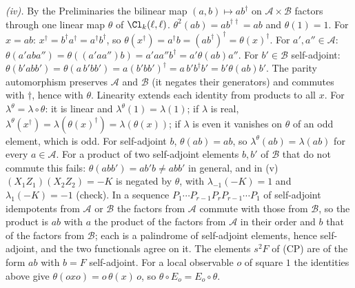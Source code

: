\emph{(iv).} By the Preliminaries the bilinear map $(a, b) \mapsto ab^{\dagger}$ on $\mathcal{A} \times \mathcal{B}$ factors through one linear map $\theta$ of $\Cl_{k}(\ell,\ell)$. $\theta^{2}(ab) = ab^{\dagger\dagger} = ab$ and $\theta(1) = 1$. For $x = ab$: $x^{\dagger} = b^{\dagger}a^{\dagger} = a^{\dagger}b^{\dagger}$, so $\theta(x^{\dagger}) = a^{\dagger}b = (ab^{\dagger})^{\dagger} = \theta(x)^{\dagger}$. For $a', a'' \in \mathcal{A}$: $\theta(a'aba'') = \theta((a'aa'')b) = a'aa''b^{\dagger} = a'\theta(ab)a''$. For $b' \in \mathcal{B}$ self-adjoint: $\theta(b'abb') = \theta(a\,b'bb') = a(b'bb')^{\dagger} = a\,b'b^{\dagger}b' = b'\theta(ab)b'$. The parity automorphism preserves $\mathcal{A}$ and $\mathcal{B}$ (it negates their generators) and commutes with $\dagger$, hence with $\theta$. Linearity extends each identity from products to all $x$. For $\lambda^{\theta} = \lambda \circ \theta$: it is linear and $\lambda^{\theta}(1) = \lambda(1)$; if $\lambda$ is real, $\lambda^{\theta}(x^{\dagger}) = \lambda(\theta(x)^{\dagger}) = \lambda(\theta(x))$; if $\lambda$ is even it vanishes on $\theta$ of an odd element, which is odd. For self-adjoint $b$, $\theta(ab) = ab$, so $\lambda^{\theta}(ab) = \lambda(ab)$ for every $a \in \mathcal{A}$. For a product of two self-adjoint elements $b, b'$ of $\mathcal{B}$ that do not commute this fails: $\theta(abb') = ab'b \ne abb'$ in general, and in (v) $(X_{1}Z_{1})(X_{2}Z_{2}) = -K$ is negated by $\theta$, with $\lambda_{-1}(-K) = 1$ and $\lambda_{1}(-K) = -1$ (check). In a sequence $P_{1}\cdots P_{r-1}P_{r}P_{r-1}\cdots P_{1}$ of self-adjoint idempotents from $\mathcal{A}$ or $\mathcal{B}$ the factors from $\mathcal{A}$ commute with those from $\mathcal{B}$, so the product is $ab$ with $a$ the product of the factors from $\mathcal{A}$ in their order and $b$ that of the factors from $\mathcal{B}$; each is a palindrome of self-adjoint elements, hence self-adjoint, and the two functionals agree on it. The elements $s^{2}F$ of (CP) are of the form $ab$ with $b = F$ self-adjoint. For a local observable $o$ of square $1$ the identities above give $\theta(oxo) = o\,\theta(x)\,o$, so $\theta \circ E_{o} = E_{o} \circ \theta$.

